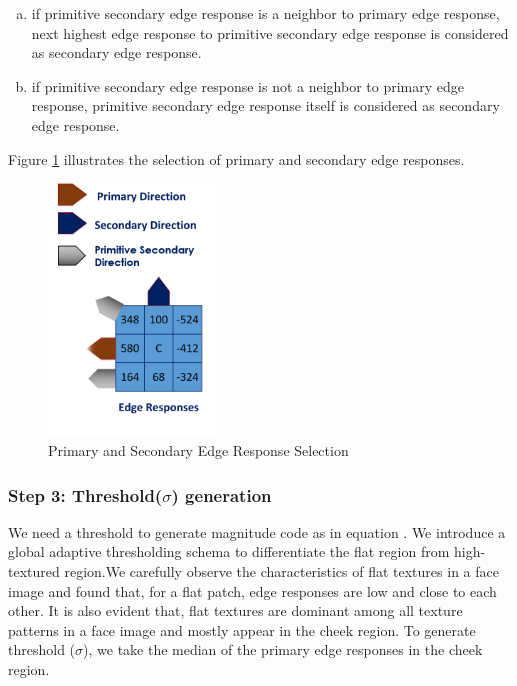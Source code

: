 \documentclass[12pt]{article}
\begin{document}
\begin{enumerate}[a.]
	\item if primitive secondary edge response is a neighbor to primary edge response, next highest edge response to primitive secondary edge response is considered as secondary edge response. 
	\item if primitive secondary edge response is not a neighbor to primary edge response, primitive secondary edge response itself is considered as secondary edge response.
	
	
\end{enumerate}

Figure \ref{fig:primary_secondary_ER} illustrates the selection of primary and secondary edge responses.
\begin{figure}[H]
	\begin{center}
		\centering
		\includegraphics[width=0.4\textwidth]{primary_secondary_ER.png}
		\caption{Primary and Secondary Edge Response Selection}
				\label{fig:primary_secondary_ER}
	\end{center}
\end{figure}


\subsubsection{Step 3: Threshold($\sigma$) generation} 
We need a threshold to generate magnitude code as in equation . We introduce a global adaptive thresholding schema to differentiate the flat region from high-textured region.We carefully observe the characteristics of flat textures in a face image and found that, for a flat patch, edge responses are low and close to each other. It is also evident that, flat textures are dominant among all texture patterns in a face image and mostly appear in the cheek region. To generate threshold ($\sigma$), we take the median of the primary edge responses in the cheek region. 
\end{document}
